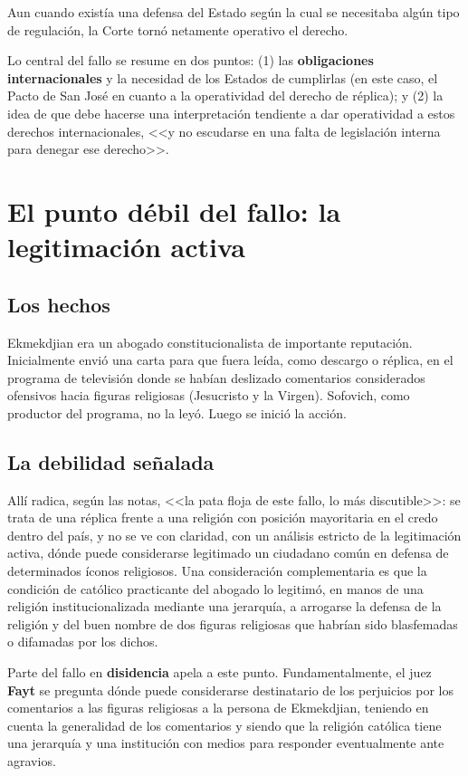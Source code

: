 \documentclass[12pt,oneside]{book}
\begin{document}
Aun cuando existía una defensa del Estado según la cual se necesitaba algún tipo de regulación, la Corte tornó netamente operativo el derecho.

\begin{important}
Lo central del fallo se resume en dos puntos: (1) las \textbf{obligaciones internacionales} y la necesidad de los Estados de cumplirlas (en este caso, el Pacto de San José en cuanto a la operatividad del derecho de réplica); y (2) la idea de que debe hacerse una interpretación tendiente a dar operatividad a estos derechos internacionales, <<y no escudarse en una falta de legislación interna para denegar ese derecho>>.
\end{important}

\section{El punto débil del fallo: la legitimación activa}

\subsection{Los hechos}

Ekmekdjian era un abogado constitucionalista de importante reputación. Inicialmente envió una carta para que fuera leída, como descargo o réplica, en el programa de televisión donde se habían deslizado comentarios considerados ofensivos hacia figuras religiosas (Jesucristo y la Virgen). Sofovich, como productor del programa, no la leyó. Luego se inició la acción.

\subsection{La debilidad señalada}

Allí radica, según las notas, <<la pata floja de este fallo, lo más discutible>>: se trata de una réplica frente a una religión con posición mayoritaria en el credo dentro del país, y no se ve con claridad, con un análisis estricto de la legitimación activa, dónde puede considerarse legitimado un ciudadano común en defensa de determinados íconos religiosos. Una consideración complementaria es que la condición de católico practicante del abogado lo legitimó, en manos de una religión institucionalizada mediante una jerarquía, a arrogarse la defensa de la religión y del buen nombre de dos figuras religiosas que habrían sido blasfemadas o difamadas por los dichos.

Parte del fallo en \textbf{disidencia} apela a este punto. Fundamentalmente, el juez \textbf{Fayt} se pregunta dónde puede considerarse destinatario de los perjuicios por los comentarios a las figuras religiosas a la persona de Ekmekdjian, teniendo en cuenta la generalidad de los comentarios y siendo que la religión católica tiene una jerarquía y una institución con medios para responder eventualmente ante agravios.
\end{document}

